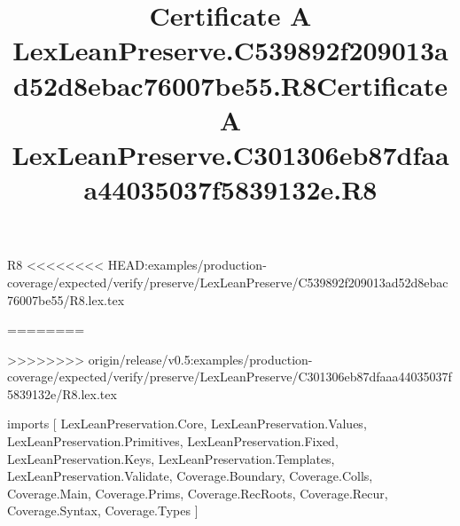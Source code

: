 \begin{lexlean}{R8}
<<<<<<<< HEAD:examples/production-coverage/expected/verify/preserve/LexLeanPreserve/C539892f209013ad52d8ebac76007be55/R8.lex.tex
\title{Certificate A LexLeanPreserve.C539892f209013ad52d8ebac76007be55.R8}
========
\title{Certificate A LexLeanPreserve.C301306eb87dfaaa44035037f5839132e.R8}
>>>>>>>> origin/release/v0.5:examples/production-coverage/expected/verify/preserve/LexLeanPreserve/C301306eb87dfaaa44035037f5839132e/R8.lex.tex
\begin{coremodule}
imports [
  LexLeanPreservation.Core,
  LexLeanPreservation.Values,
  LexLeanPreservation.Primitives,
  LexLeanPreservation.Fixed,
  LexLeanPreservation.Keys,
  LexLeanPreservation.Templates,
  LexLeanPreservation.Validate,
  Coverage.Boundary,
  Coverage.Colls,
  Coverage.Main,
  Coverage.Prims,
  Coverage.RecRoots,
  Coverage.Recur,
  Coverage.Syntax,
  Coverage.Types
]


\end{coremodule}
\end{lexlean}
